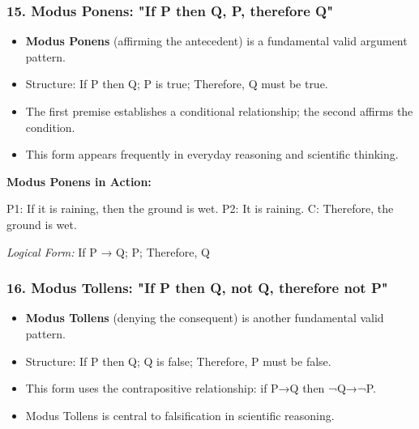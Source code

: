 \documentclass{beamer}
\begin{document}
\begin{frame}
\frametitle{15. Modus Ponens: "If P then Q, P, therefore Q"}
\begin{itemize}
\item \textbf{Modus Ponens} (affirming the antecedent) is a fundamental valid argument pattern.
\item Structure: If P then Q; P is true; Therefore, Q must be true.
\item The first premise establishes a conditional relationship; the second affirms the condition.
\item This form appears frequently in everyday reasoning and scientific thinking.
\end{itemize}

\begin{example}
\textbf{Modus Ponens in Action:}

P1: If it is raining, then the ground is wet.
P2: It is raining.
C: Therefore, the ground is wet.

\textit{Logical Form:} If P → Q; P; Therefore, Q
\end{example}
\end{frame}

\begin{frame}
\frametitle{16. Modus Tollens: "If P then Q, not Q, therefore not P"}
\begin{itemize}
\item \textbf{Modus Tollens} (denying the consequent) is another fundamental valid pattern.
\item Structure: If P then Q; Q is false; Therefore, P must be false.
\item This form uses the contrapositive relationship: if P→Q then ¬Q→¬P.
\item Modus Tollens is central to falsification in scientific reasoning.
\end{itemize}

\end{frame}
\end{document}
